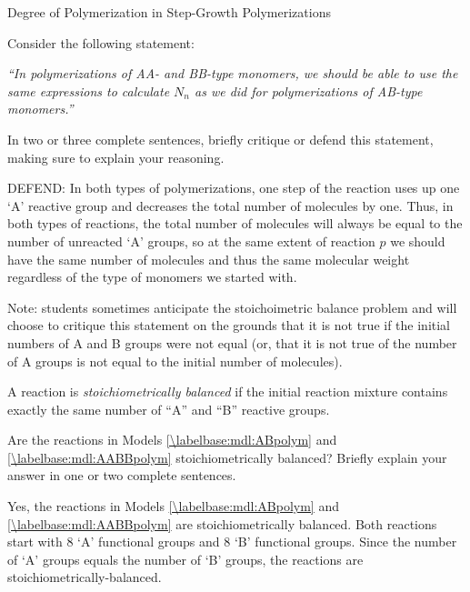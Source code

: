 \begin{activity}{Degree of Polymerization in Step-Growth Polymerizations}
\begin{ctqs}
		\question Consider the following statement:
		
			\emph{``In polymerizations of AA- and BB-type monomers, we should be able to use the same expressions to calculate $N_n$ as we did for polymerizations of AB-type monomers.''}
			
			In two or three complete sentences, briefly critique or defend this statement, making sure to explain your reasoning.
		
			\begin{solution}[1.75in]{}
				DEFEND: In both types of polymerizations, one step of the reaction uses up one `A' reactive group and decreases the total number of molecules by one. Thus, in both types of reactions, the total number of molecules will always be equal to the number of unreacted `A' groups, so at the same extent of reaction $p$ we should have the same number of molecules and thus the same molecular weight regardless of the type of monomers we started with.
				
				Note: students sometimes anticipate the stoichoimetric balance problem and will choose to critique this statement on the grounds that it is not true if the initial numbers of A and B groups were not equal (or, that it is not true of the number of A groups is not equal to the initial number of molecules). 
			\end{solution}
			
\end{ctqs}
	
\begin{infobox}

A reaction is \emph{stoichiometrically balanced} if the initial reaction mixture contains exactly the same number of ``A'' and ``B'' reactive groups.

\end{infobox}
	
\begin{ctqs}
		\question Are the reactions in Models \ref{\labelbase:mdl:ABpolym} and \ref{\labelbase:mdl:AABBpolym} stoichiometrically balanced?  Briefly explain your answer in one or two complete sentences.
		
		\begin{solution}[1in]{}
			Yes, the reactions in Models \ref{\labelbase:mdl:ABpolym} and \ref{\labelbase:mdl:AABBpolym} are stoichiometrically balanced.  Both reactions start with 8 `A' functional groups and 8 `B' functional groups.  Since the number of `A' groups equals the number of `B' groups, the reactions are stoichiometrically-balanced.
		\end{solution}
		

\end{ctqs}
\end{activity}
